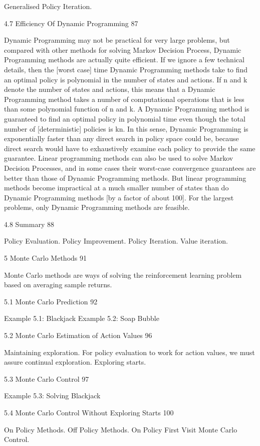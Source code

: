 Generalised Policy Iteration.

4.7 Efficiency Of Dynamic Programming 87

Dynamic Programming may not be practical for very large problems, but compared with other methods for solving Markov Decision Process, Dynamic Programming methods are actually quite efficient. If we ignore a few technical details, then the [worst case] time Dynamic Programming methods take to find an optimal policy is polynomial in the number of states and actions. If n and k denote the number of states and actions, this means that a Dynamic Programming method takes a number of computational operations that is less than some polynomial function of n and k. A Dynamic Programming method is guaranteed to find an optimal policy in polynomial time even though the total number of [deterministic] policies is kn. In this sense, Dynamic Programming is exponentially faster than any direct search in policy space could be, because direct search would have to exhaustively examine each policy to provide the same guarantee. Linear programming methods can also be used to solve Markov Decision Processes, and in some cases their worst-case convergence guarantees are better than those of Dynamic Programming methods. But linear programming methods become impractical at a much smaller number of states than do Dynamic Programming methods [by a factor of about 100]. For the largest problems, only Dynamic Programming methods are feasible.

4.8 Summary 88

Policy Evaluation. Policy Improvement. Policy Iteration. Value iteration.

5 Monte Carlo Methods 91

Monte Carlo methods are ways of solving the reinforcement learning problem based on averaging sample returns.

5.1 Monte Carlo Prediction 92

Example 5.1: Blackjack
Example 5.2: Soap Bubble

5.2 Monte Carlo Estimation of Action Values 96

Maintaining exploration. For policy evaluation to work for action values, we must assure continual exploration. Exploring starts.

5.3 Monte Carlo Control 97

Example 5.3: Solving Blackjack

5.4 Monte Carlo Control Without Exploring Starts 100

On Policy Methods. Off Policy Methods. On Policy First Visit Monte Carlo Control.

